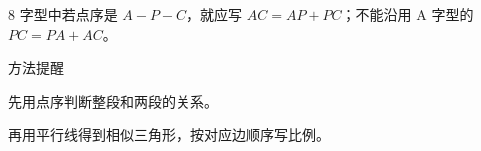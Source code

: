 \documentclass{exam-zh}
\begin{document}
\begin{eduDualExplain}
  \begin{eduExplainLeft}
  \end{eduExplainLeft}

  \begin{eduExplainRight}
      \begin{center}
        \begin{diagramcoltikz}{70mm}{交叉的两条截线中，仍按同一顺序找三组对应边。}
        }
        \end{diagramcoltikz}
      \end{center}
  \end{eduExplainRight}
\end{eduDualExplain}




\begin{eduMistakeBox}
8 字型中若点序是 $A-P-C$，就应写 $AC=AP+PC$；不能沿用 A 字型的 $PC=PA+AC$。\end{eduMistakeBox}




\begin{eduSummaryBlock}{\eduIconPin}{方法提醒}
\begin{eduBulletList}
  \item 先用点序判断整段和两段的关系。  \item 再用平行线得到相似三角形，按对应边顺序写比例。\end{eduBulletList}
\end{eduSummaryBlock}
\end{document}
